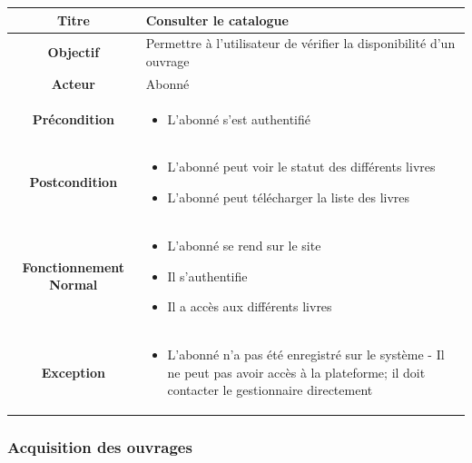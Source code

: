 \begin{tabular}{|c|p{7cm}|}
        \hline
        \textbf{Titre} & Consulter le catalogue  \\
        \hline
        \textbf{Objectif}  & Permettre à l'utilisateur de vérifier la disponibilité d'un ouvrage \\
        \hline
        \textbf{Acteur} & Abonné \\
        \hline
        \textbf{Précondition} & \begin{itemize}
                \item L'abonné s'est authentifié 
        \end{itemize} \\
        \hline
        \textbf{Postcondition} & \begin{itemize}
                \item L'abonné peut voir le statut des différents livres
                \item L'abonné peut télécharger la liste des livres
        \end{itemize} \\
        \hline
        \textbf{Fonctionnement Normal} & \begin{itemize}
                \item L'abonné se rend sur le site
                \item Il s'authentifie
                \item Il a accès aux différents livres
        \end{itemize} \\
        \hline
        \textbf{Exception} & \begin{itemize}
                \item L'abonné n'a pas été enregistré sur le système - Il ne peut pas avoir 
                accès à la plateforme; il doit contacter le gestionnaire directement
        \end{itemize} \\
        \hline
\end{tabular}

\subsubsection{Acquisition des ouvrages}
